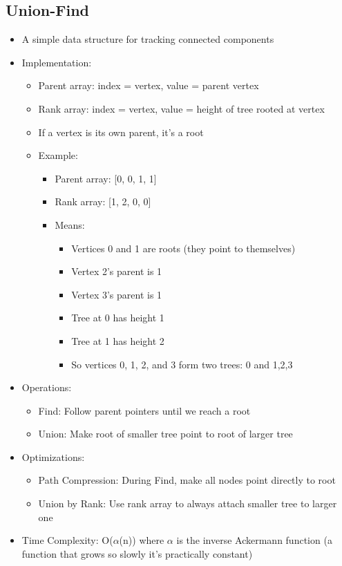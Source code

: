 \documentclass[11pt,a4paper]{article}
\begin{document}
\begin{multicols}{2}
\subsection{Union-Find}
\begin{itemize}
    \item A simple data structure for tracking connected components
    \item Implementation:
    \begin{itemize}
        \item Parent array: index = vertex, value = parent vertex
        \item Rank array: index = vertex, value = height of tree rooted at vertex
        \item If a vertex is its own parent, it's a root
        \item Example: 
        \begin{itemize}
            \item Parent array: [0, 0, 1, 1]
            \item Rank array: [1, 2, 0, 0]
            \item Means:
            \begin{itemize}
                \item Vertices 0 and 1 are roots (they point to themselves)
                \item Vertex 2's parent is 1
                \item Vertex 3's parent is 1
                \item Tree at 0 has height 1
                \item Tree at 1 has height 2
                \item So vertices 0, 1, 2, and 3 form two trees: {0} and {1,2,3}
            \end{itemize}
        \end{itemize}
    \end{itemize}
    \item Operations:
    \begin{itemize}
        \item Find: Follow parent pointers until we reach a root
        \item Union: Make root of smaller tree point to root of larger tree
    \end{itemize}
    \item Optimizations:
    \begin{itemize}
        \item Path Compression: During Find, make all nodes point directly to root
        \item Union by Rank: Use rank array to always attach smaller tree to larger one
    \end{itemize}
    \item Time Complexity: O($\alpha$(n)) where $\alpha$ is the inverse Ackermann function (a function that grows so slowly it's practically constant)
\end{itemize}


\end{multicols}
\end{document}
